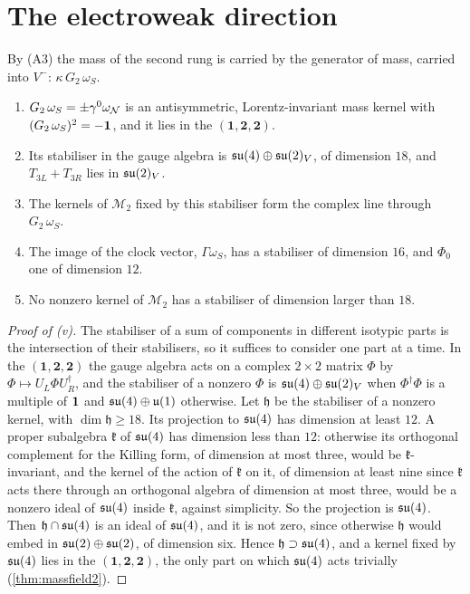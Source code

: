 \section{The electroweak direction}

By (A3) the mass of the second rung is carried by the generator of mass, carried into $V^-$: $\kappa\,G_2\,\omega_S$.

\begin{proposition}
\label{prop:ewdir}
\begin{enumerate}[label=(\roman*),leftmargin=2.2em,itemsep=1pt]
\item $G_2\,\omega_S=\pm\gamma^0\omega_\mathcal N$ is an antisymmetric, Lorentz-invariant mass kernel with $(G_2\,\omega_S)^2=-\mathbf 1$, and it lies in
the $(\mathbf1,\mathbf2,\mathbf2)$.
\item Its stabiliser in the gauge algebra is $\mathfrak{su}(4)\oplus\mathfrak{su}(2)_V$, of dimension $18$, and $T_{3L}+T_{3R}$ lies in $\mathfrak{su}(2)_V$.
\item The kernels of $\mathcal M_2$ fixed by this stabiliser form the complex line through $G_2\,\omega_S$.
\item The image of the clock vector, $\Gamma\omega_S$, has a stabiliser of dimension $16$, and $\Phi_0$ one of dimension $12$.
\item No nonzero kernel of $\mathcal M_2$ has a stabiliser of dimension larger than $18$.
\end{enumerate}
\end{proposition}

\begin{proof}[Proof of (v)]
The stabiliser of a sum of components in different isotypic parts is the intersection of their stabilisers, so it suffices to consider one
part at a time. In the $(\mathbf1,\mathbf2,\mathbf2)$ the gauge algebra acts on a complex $2\times2$ matrix $\Phi$ by
$\Phi\mapsto U_L\Phi U_R^\dagger$, and the stabiliser of a nonzero $\Phi$ is $\mathfrak{su}(4)\oplus\mathfrak{su}(2)_V$ when $\Phi^\dagger\Phi$ is a multiple of
$\mathbf 1$ and $\mathfrak{su}(4)\oplus\mathfrak{u}(1)$ otherwise. Let $\mathfrak h$ be the stabiliser of a nonzero kernel, with $\dim\mathfrak h\ge18$. Its projection to
$\mathfrak{su}(4)$ has dimension at least $12$. A proper subalgebra $\mathfrak k$ of $\mathfrak{su}(4)$ has dimension less than $12$: otherwise its orthogonal
complement for the Killing form, of dimension at most three, would be $\mathfrak k$-invariant, and the kernel of the action of $\mathfrak k$
on it, of dimension at least nine since $\mathfrak k$ acts there through an orthogonal algebra of dimension at most three, would be a nonzero
ideal of $\mathfrak{su}(4)$ inside $\mathfrak k$, against simplicity. So the projection is $\mathfrak{su}(4)$. Then $\mathfrak h\cap\mathfrak{su}(4)$ is an ideal of $\mathfrak{su}(4)$, and
it is not zero, since otherwise $\mathfrak h$ would embed in $\mathfrak{su}(2)\oplus\mathfrak{su}(2)$, of dimension six. Hence $\mathfrak h\supset\mathfrak{su}(4)$, and a kernel
fixed by $\mathfrak{su}(4)$ lies in the $(\mathbf1,\mathbf2,\mathbf2)$, the only part on which $\mathfrak{su}(4)$ acts trivially (\cref{thm:massfield2}).
\end{proof}


